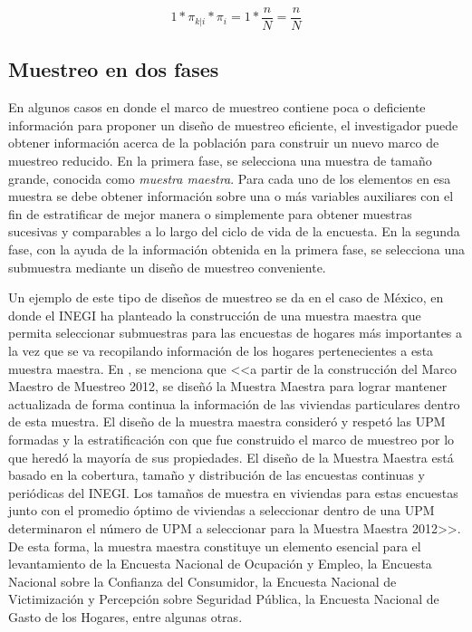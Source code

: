 \[1 * \pi_{k|i} * \pi_i = 1 * \frac{n}{N} = \frac{n}{N}\]

\hypertarget{muestreo-en-dos-fases}{%
\subsection*{Muestreo en dos fases}\label{muestreo-en-dos-fases}}


En algunos casos en donde el marco de muestreo contiene poca o deficiente información para proponer un diseño de muestreo eficiente, el investigador puede obtener información acerca de la población para construir un nuevo marco de muestreo reducido. En la primera fase, se selecciona una muestra de tamaño grande, conocida como \emph{muestra maestra}. Para cada uno de los elementos en esa muestra se debe obtener información sobre una o más variables auxiliares con el fin de estratificar de mejor manera o simplemente para obtener muestras sucesivas y comparables a lo largo del ciclo de vida de la encuesta. En la segunda fase, con la ayuda de la información obtenida en la primera fase, se selecciona una submuestra mediante un diseño de muestreo conveniente.

Un ejemplo de este tipo de diseños de muestreo se da en el caso de México, en donde el INEGI ha planteado la construcción de una muestra maestra que permita seleccionar submuestras para las encuestas de hogares más importantes a la vez que se va recopilando información de los hogares pertenecientes a esta muestra maestra. En \citet{INEGI_MX_2012}, se menciona que \textless{}\textless{}a partir de la construcción del Marco Maestro de Muestreo 2012, se diseñó la Muestra Maestra para lograr mantener actualizada de forma continua la información de las viviendas particulares dentro de esta muestra. El diseño de la muestra maestra consideró y respetó las UPM formadas y la estratificación con que fue construido el marco de muestreo por lo que heredó la mayoría de sus propiedades. El diseño de la Muestra Maestra está basado en la cobertura, tamaño y distribución de las encuestas continuas y periódicas del INEGI. Los tamaños de muestra en viviendas para estas encuestas junto con el promedio óptimo de viviendas a seleccionar dentro de una UPM determinaron el número de UPM a seleccionar para la Muestra Maestra 2012\textgreater{}\textgreater{}. De esta forma, la muestra maestra constituye un elemento esencial para el levantamiento de la Encuesta Nacional de Ocupación y Empleo, la Encuesta Nacional sobre la Confianza del Consumidor, la Encuesta Nacional de Victimización y Percepción sobre Seguridad Pública, la Encuesta Nacional de Gasto de los Hogares, entre algunas otras.

